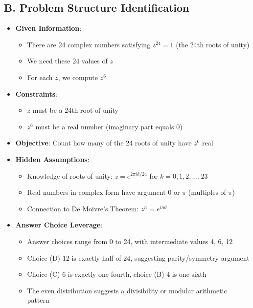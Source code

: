 \documentclass[]{article}
\begin{document}
\begin{problemconfigbox}
\subsection*{B. Problem Structure Identification}
\begin{itemize}[leftmargin=*]
    \item \textbf{Given Information}: 
    \begin{itemize}
        \item There are 24 complex numbers satisfying $z^{24} = 1$ (the 24th roots of unity)
        \item We need these 24 values of $z$
        \item For each $z$, we compute $z^6$
    \end{itemize}
    \item \textbf{Constraints}: 
    \begin{itemize}
        \item $z$ must be a 24th root of unity
        \item $z^6$ must be a real number (imaginary part equals 0)
    \end{itemize}
    \item \textbf{Objective}: Count how many of the 24 roots of unity have $z^6$ real
    \item \textbf{Hidden Assumptions}: 
    \begin{itemize}
        \item Knowledge of roots of unity: $z = e^{2\pi i k/24}$ for $k = 0, 1, 2, \ldots, 23$
        \item Real numbers in complex form have argument $0$ or $\pi$ (multiples of $\pi$)
        \item Connection to De Moivre's Theorem: $z^n = e^{in\theta}$
    \end{itemize}
    \item \textbf{Answer Choice Leverage}: 
    \begin{itemize}
        \item Answer choices range from 0 to 24, with intermediate values 4, 6, 12
        \item Choice (D) 12 is exactly half of 24, suggesting parity/symmetry argument
        \item Choice (C) 6 is exactly one-fourth, choice (B) 4 is one-sixth
        \item The even distribution suggests a divisibility or modular arithmetic pattern
    \end{itemize}
\end{itemize}


\end{problemconfigbox}
\end{document}
